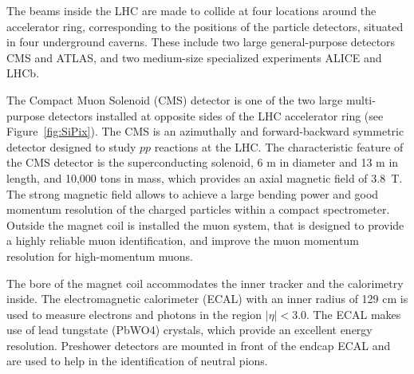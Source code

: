 The beams inside the LHC are made to collide at four locations around the 
accelerator ring, corresponding 
to the positions of the particle detectors, situated in four underground 
caverns. These include two large 
general-purpose detectors CMS and ATLAS, and two medium-size specialized 
experiments ALICE and LHCb.

The Compact Muon Solenoid (CMS) detector is one of the two large 
multi-purpose detectors 
installed at opposite sides of the LHC accelerator ring (see Figure~\ref{fig:SiPix}). 
The CMS is an azimuthally and forward-backward symmetric 
detector designed to study $pp$ reactions at the LHC.
The characteristic feature of the CMS detector is the superconducting
solenoid, 6 m in diameter and 13 m in length, and 10,000 tons in mass, 
which provides an axial magnetic field of 3.8~T. 
The strong magnetic field allows to achieve a large bending power and good 
momentum resolution of the charged particles within a compact 
spectrometer. 
Outside the magnet coil %
is installed the muon system, that 
is designed to provide a highly reliable muon identification, and
improve the muon momentum resolution for high-momentum muons. 

The bore of the magnet coil accommodates the inner tracker and the
calorimetry inside. 
The electromagnetic calorimeter (ECAL) with an inner radius of 129 cm
is used to measure electrons and photons in the region $|\eta| < 3.0$.
The ECAL makes use of lead tungstate (PbWO4) crystals, which 
provide an excellent energy resolution. 
Preshower detectors are mounted in front of the endcap ECAL and are used 
to help in the identification 
of neutral pions.

